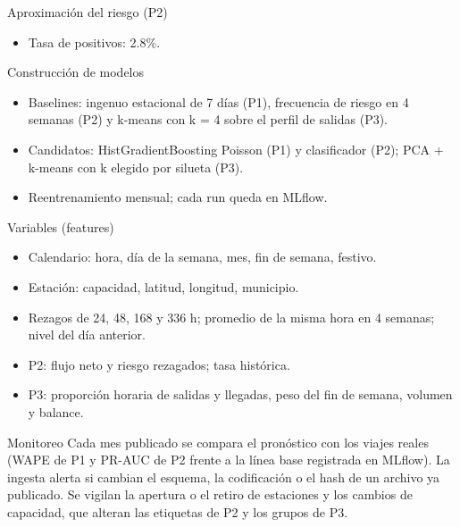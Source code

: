\documentclass[10pt]{article}
\begin{document}
\begin{tcbraster}[raster columns=5,raster equal height=rows,raster column skip=3pt,raster row skip=3pt]
\begin{celda}[b]{Aproximación del riesgo (P2)}
\begin{itemize}
\item Tasa de positivos: 2.8\%.
\end{itemize}
\end{celda}
\begin{celda}[b]{Construcción de modelos}
\begin{itemize}
\item Baselines: ingenuo estacional de 7 días (P1), frecuencia de riesgo en 4 semanas (P2) y k-means con k = 4 sobre el perfil de salidas (P3).
\item Candidatos: HistGradientBoosting Poisson (P1) y clasificador (P2); PCA + k-means con k elegido por silueta (P3).
\item Reentrenamiento mensual; cada run queda en MLflow.
\end{itemize}
\end{celda}
\begin{celda}[b]{Variables (features)}
\begin{itemize}
\item Calendario: hora, día de la semana, mes, fin de semana, festivo.
\item Estación: capacidad, latitud, longitud, municipio.
\item Rezagos de 24, 48, 168 y 336 h; promedio de la misma hora en 4 semanas; nivel del día anterior.
\item P2: flujo neto y riesgo rezagados; tasa histórica.
\item P3: proporción horaria de salidas y llegadas, peso del fin de semana, volumen y balance.
\end{itemize}
\end{celda}
\end{tcbraster}
\vspace{3pt}
\begin{celda}[c]{Monitoreo}
Cada mes publicado se compara el pronóstico con los viajes reales (WAPE de P1 y PR-AUC de P2 frente a la línea base registrada en MLflow). La ingesta alerta si cambian el esquema, la codificación o el hash de un archivo ya publicado. Se vigilan la apertura o el retiro de estaciones y los cambios de capacidad, que alteran las etiquetas de P2 y los grupos de P3.
\end{celda}
\end{document}
